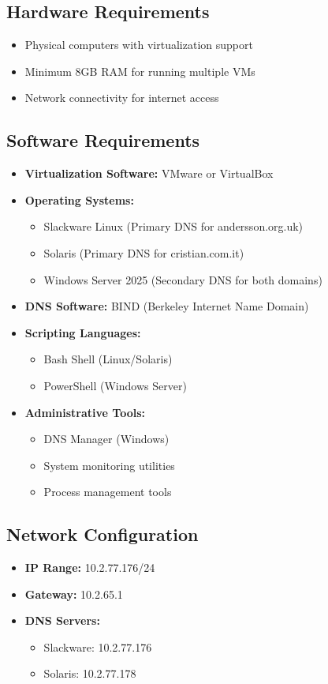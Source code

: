 \documentclass[12pt,a4paper]{article}
\begin{document}
\subsection{Hardware Requirements}
\begin{itemize}
    \item Physical computers with virtualization support
    \item Minimum 8GB RAM for running multiple VMs
    \item Network connectivity for internet access
\end{itemize}

\subsection{Software Requirements}
\begin{itemize}
    \item \textbf{Virtualization Software:} VMware or VirtualBox
    \item \textbf{Operating Systems:}
    \begin{itemize}
        \item Slackware Linux (Primary DNS for andersson.org.uk)
        \item Solaris (Primary DNS for cristian.com.it)
        \item Windows Server 2025 (Secondary DNS for both domains)
    \end{itemize}
    \item \textbf{DNS Software:} BIND (Berkeley Internet Name Domain)
    \item \textbf{Scripting Languages:}
    \begin{itemize}
        \item Bash Shell (Linux/Solaris)
        \item PowerShell (Windows Server)
    \end{itemize}
    \item \textbf{Administrative Tools:}
    \begin{itemize}
        \item DNS Manager (Windows)
        \item System monitoring utilities
        \item Process management tools
    \end{itemize}
\end{itemize}

\subsection{Network Configuration}
\begin{itemize}
    \item \textbf{IP Range:} 10.2.77.176/24
    \item \textbf{Gateway:} 10.2.65.1
    \item \textbf{DNS Servers:}
    \begin{itemize}
        \item Slackware: 10.2.77.176
        \item Solaris: 10.2.77.178
    \end{itemize}
\end{itemize}
\end{document}
